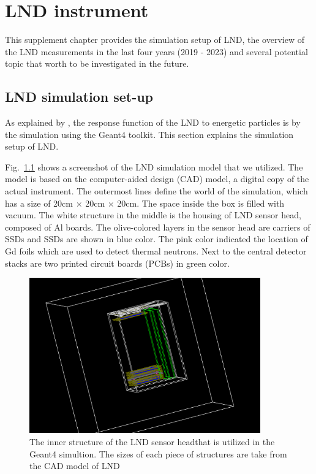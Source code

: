 \chapter{LND instrument}
\label{chp:LNDinstrument}

This supplement chapter provides the simulation setup of \ac{LND}, the overview of the \ac{LND} measurements in the last four years (2019 - 2023) and several potential topic that worth to be investigated in the future.

\section*{LND simulation set-up}
\label{chp:LNDsimulation}

As explained by \citet{Wimmer-2020-LND}, the response function of the \ac{LND} to energetic particles is by the simulation using the \ac{Geant4} toolkit. This section explains the simulation setup of \ac{LND}.

Fig.~\ref{fig:LND_simulation_model} shows a screenshot of the \ac{LND} simulation model that we utilized. The model is based on the computer-aided design (CAD) model, a digital copy of the actual instrument. 
The outermost lines define the world of the simulation, which has a size of 20cm $\times$ 20cm $\times$ 20cm. The space inside the box is filled with vacuum. The white structure in the middle is the housing of \ac{LND} sensor head, composed of Al boards.
The olive-colored layers in the sensor head are carriers of \acp{SSD} and \acp{SSD} are shown in blue color. The pink color indicated the location of Gd foils which are used to detect thermal neutrons. Next to the central detector stacks are two printed circuit boards (PCBs) in green color.

\begin{figure}[!htb]
    \centering
    \includegraphics[width= 0.89\textwidth, height = 0.6\textwidth]{images/LND_model.png}
    \caption[The sketch of \ac{LND} sensor head]{The inner structure of the \ac{LND} sensor headthat is utilized in the \ac{Geant4} simultion. The sizes of each piece of structures are take from the CAD model of \ac{LND}}
    \label{fig:LND_simulation_model}
\end{figure}


